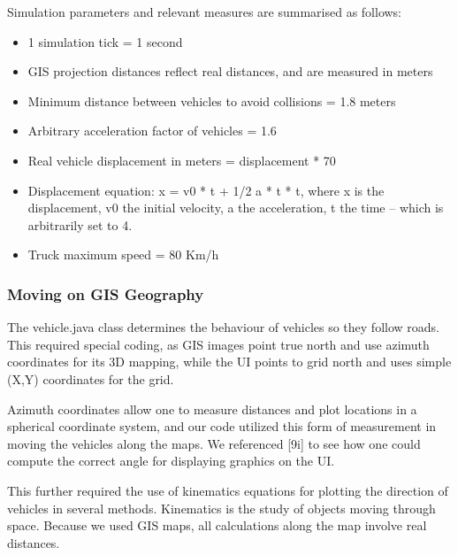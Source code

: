 \documentclass[11pt]{article}
\begin{document}
Simulation parameters and relevant measures are summarised as follows:
\begin{itemize}
\item 1 simulation tick = 1 second
\item GIS projection distances reflect real distances, and are measured in meters
\item Minimum distance between vehicles to avoid collisions = 1.8 meters
\item Arbitrary acceleration factor of vehicles = 1.6
\item Real vehicle displacement in meters = displacement * 70
\item Displacement equation:  x = v0 * t + 1/2 a * t * t, where x is the displacement, v0 the initial velocity, a the acceleration, t the time – which is arbitrarily set to 4.
\item Truck maximum speed = 80 Km/h
\end{itemize}


\subsubsection{Moving on GIS Geography}

The vehicle.java class determines the behaviour of vehicles so they follow roads. This required special coding, as GIS images point true north and use azimuth coordinates for its 3D mapping, while the UI points to grid north and uses simple (X,Y) coordinates for the grid. 

Azimuth coordinates allow one to measure distances and plot locations in a spherical coordinate system, and our code utilized this form of measurement in moving the vehicles along the maps. We referenced [9i] to see how one could compute the correct angle for displaying graphics on the UI. 

This further required the use of kinematics equations for plotting the direction of vehicles in several methods. Kinematics is the study of objects moving through space. Because we used GIS maps, all calculations along the map involve real distances.
\\
\end{document}
